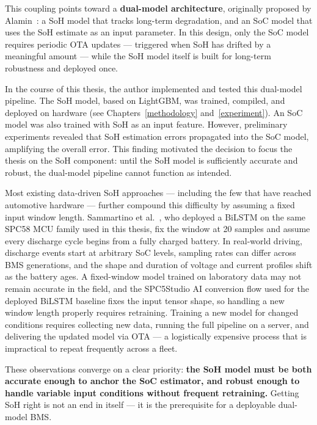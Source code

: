 This coupling points toward a \textbf{dual-model architecture}, originally proposed by Alamin~\autocite{Alamin2022}: a SoH model that tracks long-term degradation, and an SoC model that uses the SoH estimate as an input parameter. In this design, only the SoC model requires periodic \gls{OTA} updates — triggered when SoH has drifted by a meaningful amount — while the SoH model itself is built for long-term robustness and deployed once.

In the course of this thesis, the author implemented and tested this dual-model pipeline. The SoH model, based on LightGBM, was trained, compiled, and deployed on hardware (see Chapters~\ref{methodology} and~\ref{experiment}). An SoC model was also trained with SoH as an input feature. However, preliminary experiments revealed that SoH estimation errors propagated into the SoC model, amplifying the overall error. This finding motivated the decision to focus the thesis on the SoH component: until the SoH model is sufficiently accurate and robust, the dual-model pipeline cannot function as intended.

Most existing data-driven SoH approaches — including the few that have reached automotive hardware — further compound this difficulty by assuming a fixed input window length. Sammartino et al.~\autocite{Sammartino2021}, who deployed a BiLSTM on the same SPC58 MCU family used in this thesis, fix the window at 20 samples and assume every discharge cycle begins from a fully charged battery. In real-world driving, discharge events start at arbitrary SoC levels, sampling rates can differ across BMS generations, and the shape and duration of voltage and current profiles shift as the battery ages. A fixed-window model trained on laboratory data may not remain accurate in the field, and the SPC5Studio AI conversion flow used for the deployed BiLSTM baseline fixes the input tensor shape, so handling a new window length properly requires retraining. Training a new model for changed conditions requires collecting new data, running the full pipeline on a server, and delivering the updated model via OTA — a logistically expensive process that is impractical to repeat frequently across a fleet.

These observations converge on a clear priority: \textbf{the SoH model must be both accurate enough to anchor the SoC estimator, and robust enough to handle variable input conditions without frequent retraining.} Getting SoH right is not an end in itself — it is the prerequisite for a deployable dual-model BMS.


